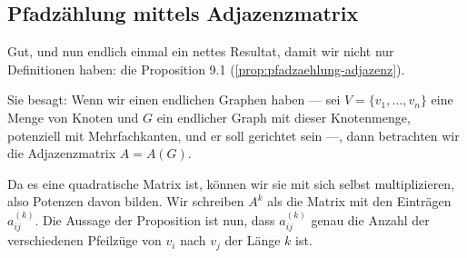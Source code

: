\subsection{Pfadzählung mittels Adjazenzmatrix}

\begin{spoken-clean}[01:14:24 - 01:17:18]
Gut, und nun endlich einmal ein nettes Resultat, damit wir nicht nur Definitionen haben: die Proposition 9.1 (\cref{prop:pfadzaehlung-adjazenz}).

Sie besagt: Wenn wir einen endlichen Graphen haben --- sei $V = \{v_1, \dots, v_n\}$ eine Menge von Knoten und $G$ ein endlicher Graph mit dieser Knotenmenge, potenziell mit Mehrfachkanten, und er soll gerichtet sein ---, dann betrachten wir die Adjazenzmatrix $A = A(G)$.

Da es eine quadratische Matrix ist, können wir sie mit sich selbst multiplizieren, also Potenzen davon bilden. Wir schreiben $A^k$ als die Matrix mit den Einträgen $a_{ij}^{(k)}$. Die Aussage der Proposition ist nun, dass $a_{ij}^{(k)}$ genau die Anzahl der verschiedenen Pfeilzüge von $v_i$ nach $v_j$ der Länge $k$ ist.
\end{spoken-clean}

\begin{math-stroke}
\end{math-stroke}

